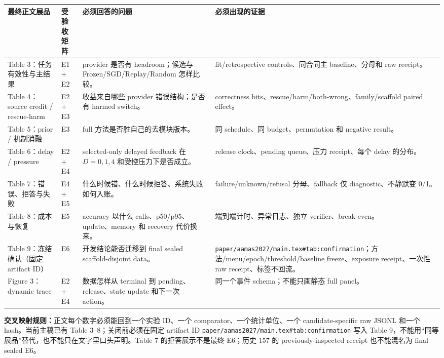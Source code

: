 \documentclass[10pt,letterpaper]{article}
\newcommand{\sect}[1]{\vspace{4pt}{\large\bfseries\color{GuideBlue}#1}\par\vspace{2pt}}
\newenvironment{clean}{\begin{center}\fontsize{8.55}{10.05}\selectfont\setlength{\tabcolsep}{3.7pt}\renewcommand{\arraystretch}{1.04}}{\end{center}}
\begin{document}
\newpage
\sect{6. 实验矩阵与正文交叉映射}
\begin{clean}
\begin{tabular}{@{}p{.12\linewidth}p{.19\linewidth}p{.29\linewidth}p{.27\linewidth}@{}}
\toprule
最终正文展品 & 受验收矩阵 & 必须回答的问题 & 必须出现的证据\\
\midrule
Table 3：任务有效性与主结果 & E1 + E2 & provider 是否有 headroom；候选与 Frozen/SGD/Replay/Random 怎样比较。 & fit/retrospective controls、同合同主 baseline、分母和 raw receipt。\\
Table 4：source credit / rescue-harm & E2 + E3 & 收益来自哪些 provider 错误结构；是否有 harmed switch。 & correctness bits、rescue/harm/both-wrong、family/scaffold paired effect。\\
Table 5：prior / 机制消融 & E3 & full 方法是否胜自己的去模块版本。 & 同 schedule、同 budget、permutation 和 negative result。\\
Table 6：delay / pressure & E2 + E4 & selected-only delayed feedback 在 $D=0,1,4$ 和受控压力下是否成立。 & release clock、pending queue、压力 receipt、每个 delay 的分布。\\
Table 7：错误、拒答与失败 & E4 + E5 & 什么时候错、什么时候拒答、系统失败如何入账。 & failure/unknown/refusal 分母、fallback 仅 diagnostic、不静默变 0/1。\\
Table 8：成本与恢复 & E5 & accuracy 以什么 calls、p50/p95、update、memory 和 recovery 代价换来。 & 端到端计时、异常日志、独立 verifier、break-even。\\
Table 9：冻结确认（固定 artifact ID） & E6 & 开发结论能否迁移到 final sealed scaffold-disjoint data。 & \texttt{paper/}\allowbreak\texttt{aamas2027/main.tex}\allowbreak\texttt{\#tab:confirmation}；方法/\allowbreak menu/\allowbreak epoch/\allowbreak threshold/\allowbreak baseline freeze、exposure receipt、一次性 raw receipt、标签不回流。\\
Figure 3：dynamic trace & E2 + E4 & 数据怎样从 terminal 到 pending、release、state update 和下一次 action。 & 同一个事件 schema；不能只画静态 full panel。\\
\bottomrule
\end{tabular}
\end{clean}
\textbf{交叉映射规则：}正文每个数字必须能回到一个实验 ID、一个 comparator、一个统计单位、一个 candidate-specific raw JSONL 和一个 hash。当前主稿已有 Table 3--8；关闭前必须在固定 artifact ID \texttt{paper/aamas2027/main.tex\#tab:confirmation} 写入 Table 9，不能用“同等展品”替代，也不能只在文字里口头声明。Table 7 的拒答展示不是最终 E6；历史 157 的 previously-inspected receipt 也不能混名为 final sealed E6。
\end{document}
